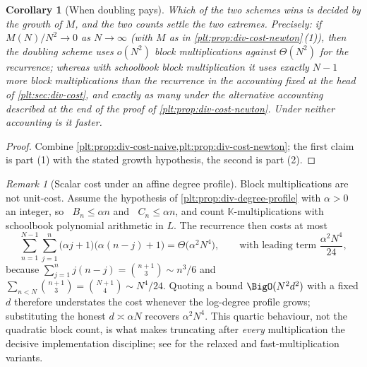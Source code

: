 \documentclass[11pt,oneside]{article}
\theoremstyle{plain}
\newtheorem{corollary}[theorem]{Corollary}
\theoremstyle{definition}
\theoremstyle{remark}
\newtheorem{remark}[theorem]{Remark}
\newcommand{\K}{\mathbb{K}}
\DeclareMathOperator{\degL}{deg_{L}}
\begin{document}
\begin{corollary}[When doubling pays]\label{plt:cor:div-doubling-pays}
Which of the two schemes wins is decided by the growth of \(M\), and the two
counts settle the two extremes.  Precisely: if \(M(N)/N^{2}\to0\) as
\(N\to\infty\) (with \(M\) as in \cref{plt:prop:div-cost-newton}\,(1)), then
the doubling scheme uses \(o(N^{2})\) block multiplications against
\(\Theta(N^{2})\) for the recurrence; whereas with schoolbook block
multiplication it uses exactly \(N-1\) \emph{more} block multiplications than
the recurrence in the accounting fixed at the head of
\cref{plt:sec:div-cost}, and exactly as many under the alternative accounting
described at the end of the proof of \cref{plt:prop:div-cost-newton}.  Under
neither accounting is it faster.
\end{corollary}

\begin{proof}
Combine \cref{plt:prop:div-cost-naive,plt:prop:div-cost-newton}; the first
claim is part (1) with the stated growth hypothesis, the second is part (2).
\end{proof}

\begin{remark}[Scalar cost under an affine degree profile]
\label{plt:rmk:div-scalar-cost}
Block multiplications are not unit-cost.  Assume the hypothesis of
\cref{plt:prop:div-degree-profile} with \(\alpha>0\) an integer, so
\(\degL B_{n}\le\alpha n\) and \(\degL C_{n}\le\alpha n\), and count
\(\K\)-multiplications with schoolbook polynomial arithmetic in \(L\).  The
recurrence then costs at most
\[
  \sum_{n=1}^{N-1}\sum_{j=1}^{n}\bigl(\alpha j+1\bigr)
       \bigl(\alpha(n-j)+1\bigr)
  =\Theta\bigl(\alpha^{2}N^{4}\bigr),
  \qquad\text{with leading term }\frac{\alpha^{2}N^{4}}{24},
\]
because \(\sum_{j=1}^{n}j(n-j)=\binom{n+1}{3}\sim n^{3}/6\) and
\(\sum_{n<N}\binom{n+1}{3}=\binom{N+1}{4}\sim N^{4}/24\).  Quoting a bound
\(\BigO(N^{2}d^{2})\)
with a fixed \(d\) therefore understates the cost whenever the log-degree
profile grows; substituting the honest \(d\asymp\alpha N\) recovers
\(\alpha^{2}N^{4}\).  This quartic behaviour, not the quadratic block count, is
what makes truncating after \emph{every} multiplication the decisive
implementation discipline; see \cite{vanderhoeven-book} for the relaxed and
fast-multiplication variants.
\end{remark}
\end{document}
